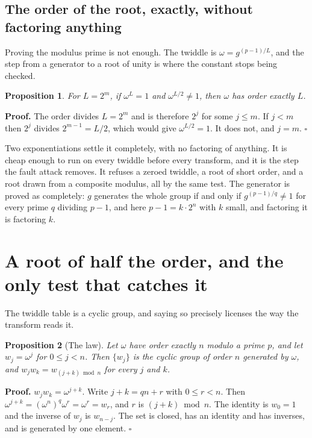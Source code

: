 \documentclass{article}
\newtheorem{proposition}{Proposition}
\begin{document}
\subsection{The order of the root, exactly, without factoring anything}

Proving the modulus prime is not enough. The twiddle is \(\omega = g^{(p-1)/L}\), and the step from a generator to a root of unity is where the constant stops being checked.

\begin{proposition}
For \(L = 2^m\), if \(\omega^L = 1\) and \(\omega^{L/2} \ne 1\), then \(\omega\) has order exactly \(L\).
\end{proposition}

\textbf{Proof.} The order divides \(L = 2^m\) and is therefore \(2^j\) for some \(j \le m\). If \(j < m\) then \(2^j\) divides \(2^{m-1} = L/2\), which would give \(\omega^{L/2} = 1\). It does not, and \(j = m\). \(\square\)

Two exponentiations settle it completely, with no factoring of anything. It is cheap enough to run on every twiddle before every transform, and it is the step the fault attack removes. It refuses a zeroed twiddle, a root of short order, and a root drawn from a composite modulus, all by the same test. The generator is proved as completely: \(g\) generates the whole group if and only if \(g^{(p-1)/q} \ne 1\) for every prime \(q\) dividing \(p-1\), and here \(p - 1 = k \cdot 2^n\) with \(k\) small, and factoring it is factoring \(k\).

\section{A root of half the order, and the only test that catches it}

The twiddle table is a cyclic group, and saying so precisely licenses the way the transform reads it.

\begin{proposition}[The law]
Let \(\omega\) have order exactly \(n\) modulo a prime \(p\), and let \(w_j = \omega^j\) for \(0 \le j < n\). Then \(\{w_j\}\) is the cyclic group of order \(n\) generated by \(\omega\), and \(w_j w_k = w_{(j+k) \bmod n}\) for every \(j\) and \(k\).
\end{proposition}

\textbf{Proof.} \(w_j w_k = \omega^{j+k}\). Write \(j + k = qn + r\) with \(0 \le r < n\). Then \(\omega^{j+k} = (\omega^n)^q \omega^r = \omega^r = w_r\), and \(r\) is \((j+k) \bmod n\). The identity is \(w_0 = 1\) and the inverse of \(w_j\) is \(w_{n-j}\). The set is closed, has an identity and has inverses, and is generated by one element. \(\square\)
\end{document}
